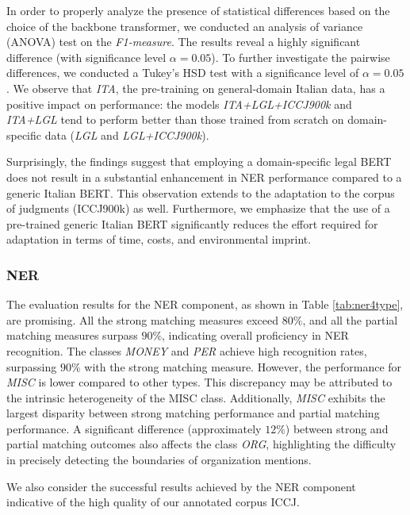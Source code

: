 In order to properly analyze the presence of statistical differences based on the choice of the backbone transformer, we conducted an analysis of variance (ANOVA) test on the \textit{F1-measure}. The results reveal a highly significant difference (with significance level $\alpha=0.05$). To further investigate the pairwise differences, we conducted a Tukey's HSD test with a significance level of $\alpha=0.05$. We observe that \textit{ITA}, the pre-training on general-domain Italian data, has a positive impact on performance: the models \textit{ITA+LGL+ICCJ900k} and \textit{ITA+LGL} tend to perform better than those trained from scratch on domain-specific data (\textit{LGL} and \textit{LGL+ICCJ900k}).

Surprisingly, the findings suggest that employing a domain-specific legal BERT does not result in a substantial enhancement in NER performance compared to a generic Italian BERT. This observation extends to the adaptation to the corpus of judgments (ICCJ900k) as well. Furthermore, we emphasize that the use of a pre-trained generic Italian BERT significantly reduces the effort required for adaptation in terms of time, costs, and environmental imprint.



\subsubsection{NER}

The evaluation results for the NER component, as shown in Table \ref{tab:ner4type}, are promising. All the strong matching measures exceed $80\%$, and all the partial matching measures surpass $90\%$, indicating overall proficiency in NER recognition. The classes \textit{MONEY} and \textit{PER} achieve high recognition rates, surpassing $90\%$ with the strong matching measure. However, the performance for \textit{MISC} is lower compared to other types. This discrepancy may be attributed to the intrinsic heterogeneity of the MISC class. Additionally, \textit{MISC} exhibits the largest disparity between strong matching performance and partial matching performance. A significant difference (approximately $12\%$) between strong and partial matching outcomes also affects the class \textit{ORG}, highlighting the difficulty in precisely detecting the boundaries of organization mentions.

We also consider the successful results achieved by the NER component indicative of the high quality of our annotated corpus ICCJ.

